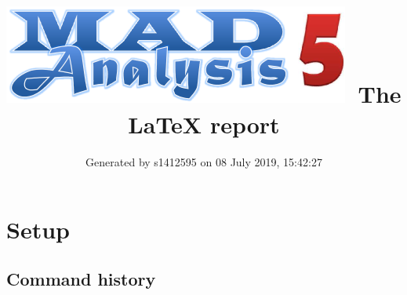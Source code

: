 \documentclass[a4paper, 10pt]{article}
\title{{\includegraphics[scale=.4]{logo.png}}\ The LaTeX report}
\author{Generated by s1412595 on 08 July 2019, 15:42:27}
\begin{document}
\maketitle
\flushbottom

\newpage
\section{ Setup}

\subsection{ Command history}
\end{document}

